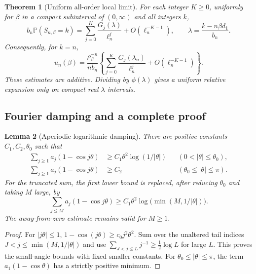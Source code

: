 \documentclass[11pt,a4paper]{article}
\numberwithin{equation}{section}
\newtheorem{theorem}{Theorem}[section]
\newtheorem{lemma}[theorem]{Lemma}
\theoremstyle{definition}
\theoremstyle{remark}
\newcommand{\Prob}{\mathbb P}
\newcommand{\ph}{\phi}
\begin{document}
\begin{theorem}[Uniform all-order local limit]
\label{thm:allorders}
For each integer $K\ge0$, uniformly for $\beta$ in a compact subinterval
of $(0,\infty)$ and all integers $k$,
\begin{equation}\label{eq:localexp}
 \boxed{\quad
 b_n\Prob(S_{n,\beta}=k)
 =\sum_{j=0}^{K}\frac{G_j(\lambda)}{\ell_n^j}
       +O(\ell_n^{-K-1}),
 \qquad \lambda=\frac{k-n\beta d_1}{b_n}.
 \quad}
\end{equation}
Consequently, for $k=n$,
\begin{equation}\label{eq:sectorexp}
 u_n(\beta)=\frac{\rho_\beta^{-n}}{n b_n}
 \left\{\sum_{j=0}^{K}\frac{G_j(\lambda_n)}{\ell_n^j}
       +O(\ell_n^{-K-1})\right\}.
\end{equation}
These estimates are additive. Dividing by $\ph(\lambda)$ gives a uniform
relative expansion only on compact real $\lambda$ intervals.
\end{theorem}

\subsection{Fourier damping and a complete proof}
\begin{lemma}[Aperiodic logarithmic damping]
\label{lem:damping}
There are positive constants $C_1,C_2,\theta_0$ such that
\begin{align}
 \sum_{j\ge1}a_j(1-\cos j\theta)
 &\ge C_1\theta^2\log(1/|\theta|)
       &&(0<|\theta|\le\theta_0),\label{eq:damping-small}\\
 \sum_{j\ge1}a_j(1-\cos j\theta)
 &\ge C_2 &&(\theta_0\le|\theta|\le\pi).
 \label{eq:damping-away}
\end{align}
For the truncated sum, the first lower bound is replaced, after reducing
$\theta_0$ and taking $M$ large, by
\begin{equation}\label{eq:damping-truncated}
 \sum_{j\le M}a_j(1-\cos j\theta)
 \ge C_1\theta^2\log\bigl(\min(M,1/|\theta|)\bigr).
\end{equation}
The away-from-zero estimate remains valid for $M\ge1$.
\end{lemma}
\begin{proof}
For $|j\theta|\le1$, $1-\cos(j\theta)\ge c_0j^2\theta^2$.
Sum over the unaltered tail indices
$J<j\le\min(M,1/|\theta|)$ and use
$\sum_{J<j\le L}j^{-1}\ge\frac12\log L$ for large $L$.
This proves the small-angle bounds with fixed smaller constants.
For $\theta_0\le|\theta|\le\pi$, the term
$a_1(1-\cos\theta)$ has a strictly positive minimum.
\end{proof}
\end{document}
